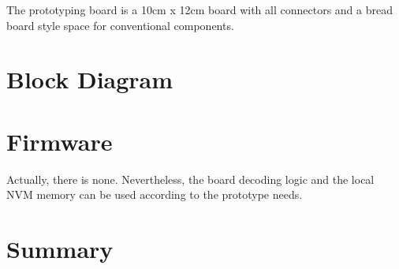 The prototyping board is a 10cm x 12cm board with all connectors and a bread board style space for conventional components.

\section{Block Diagram}


\section{Firmware}

Actually, there is none. Nevertheless, the board decoding logic and the local NVM memory can be used according to the prototype needs.

\section{Summary}


